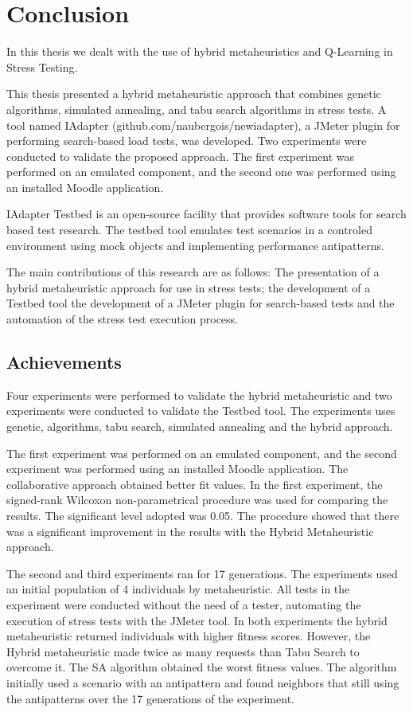 \chapter{Conclusion}

In this thesis we dealt with the use of hybrid metaheuristics and Q-Learning in Stress Testing.

This thesis presented a hybrid metaheuristic approach that combines genetic algorithms, simulated annealing, and tabu search algorithms in stress tests. A tool named IAdapter (github.com/naubergois/newiadapter), a JMeter plugin for performing search-based load tests, was developed. Two experiments were conducted to validate the proposed approach. The first experiment was performed on an emulated component, and the second one was performed using an installed Moodle application.

IAdapter Testbed is an open-source facility that provides software tools for search based test research. The testbed tool emulates test scenarios in a controled environment using mock objects and implementing performance antipatterns.

The main contributions of this research are as follows: The presentation of a hybrid metaheuristic approach for use in stress tests; the development of a Testbed tool the development of a JMeter plugin  for search-based tests and  the automation of the stress test execution process.  

\section{Achievements}

Four experiments were performed to validate the hybrid metaheuristic and two experiments were conducted to validate the Testbed tool. The experiments uses genetic, algorithms, tabu search, simulated annealing and the hybrid approach. 
 
The first experiment was performed on an emulated component, and the second experiment was performed using an installed Moodle application.  The collaborative approach obtained better fit values. In the first experiment, the signed-rank Wilcoxon non-parametrical procedure was used for comparing the results. The significant level adopted was 0.05. The procedure showed that there was a significant improvement in the results with the Hybrid Metaheuristic approach.

The second and third experiments ran for 17 generations. The experiments used an initial population of 4 individuals by metaheuristic. All tests in the experiment were conducted without the need of a tester, automating the execution of stress tests with the JMeter tool. In both experiments the hybrid metaheuristic returned individuals with higher fitness scores. However, the Hybrid metaheuristic made twice as many requests than Tabu Search to overcome it. The SA algorithm obtained the worst fitness values. The algorithm initially used a scenario with an antipattern and found neighbors that still using the antipatterns over the 17 generations of the experiment.

